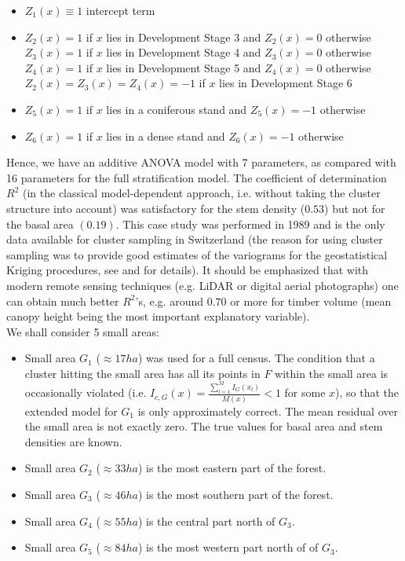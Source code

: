 \documentclass[a4paper,12pt,leqno, titlepage]{article}
\begin{document}
\begin{itemize}
\item
$Z_1(x) \equiv 1$ intercept term
\item
$Z_2(x)=1$ if $x$ lies in Development Stage 3 and $Z_2(x)=0$
otherwise
\newline $Z_3(x)=1$ if $x$ lies in Development Stage 4 and $Z_3(x)=0$
otherwise
\newline $Z_4(x)=1$ if $x$ lies in Development Stage 5 and $Z_4(x)=0$
otherwise
\newline $Z_2(x)=Z_3(x)=Z_4(x)=-1$ if $x$ lies in Development Stage
6
\item
$Z_5(x)=1$ if $x$ lies in a coniferous stand and $Z_5(x)=-1$
otherwise
\item
$Z_6(x)=1$ if $x$ lies in a dense stand and $Z_6(x)=-1$ otherwise
\end{itemize}
Hence, we have an additive ANOVA model with 7 parameters, as compared with 16 parameters for the full stratification model. The coefficient of determination $R^2$ (in the classical model-dependent approach, i.e. without taking the cluster structure into account) was satisfactory for the stem density ($0.53$) but not for the basal area $(0.19)$. This case study was performed in 1989 and is the only data available for cluster sampling in Switzerland (the reason for using cluster sampling was to provide good estimates of the variograms for the geostatistical Kriging procedures, see \cite{mandallaz} and \cite{dmhabil} for details). It should be emphasized that with modern remote sensing techniques (e.g. LiDAR or digital aerial photographs) one can obtain much better $R^2$'s, e.g.  around $0.70$ or more for timber volume (mean canopy height being the most important explanatory variable).\\
We shall consider 5 small areas:
\begin{itemize}
\item
Small area $G_1$ ($\approx 17ha$) was used for a full census. The condition that a cluster hitting the small area has all its points in $F$ within the small area is occasionally  violated (i.e. $I_{c,G}(x)=\frac{\sum_{l=1}^M I_G(x_l)}{M(x)} <1$ for some $x$), so that the extended model for $G_1$ is only approximately correct. The mean residual over the small area is not exactly zero. The true values for basal area and stem densities are known.
\item
Small area $G_2$ ($\approx 33ha$) is the most eastern part of the forest.
\item
Small area $G_3$ ($\approx 46ha$) is the most southern part of the forest.
\item
Small area $G_4$ ($\approx 55ha$) is the central part north of $G_3$.
\item
Small area $G_5$ ($\approx 84ha$) is the most western part north of of $G_3$.
\end{itemize}
\end{document}
